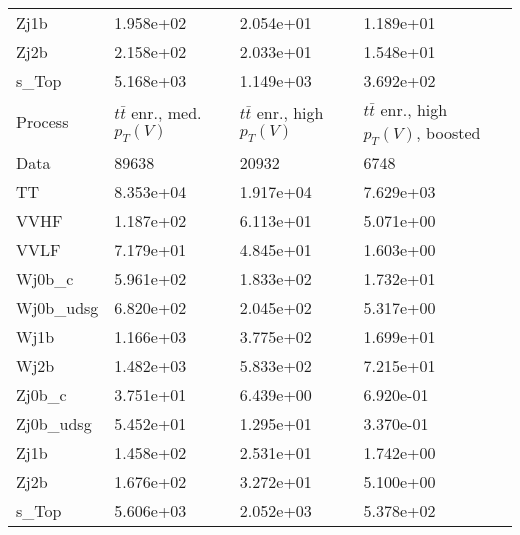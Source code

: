 \begin{table}
{\begin{tabularx}{0.8\textwidth}{|X|X|X|X|}
Zj1b & 1.958e+02 & 2.054e+01 & 1.189e+01 \\
Zj2b & 2.158e+02 & 2.033e+01 & 1.548e+01 \\
s\_Top & 5.168e+03 & 1.149e+03 & 3.692e+02 \\
\hline
\hline
Process & $t\bar{t}$ enr., med. $p_{T}(V)$ & $t\bar{t}$ enr., high $p_{T}(V)$ & $t\bar{t}$ enr., high $p_{T}(V)$, boosted \\
\hline
Data & 89638 & 20932 & 6748 \\
\hline
TT & 8.353e+04 & 1.917e+04 & 7.629e+03 \\
VVHF & 1.187e+02 & 6.113e+01 & 5.071e+00 \\
VVLF & 7.179e+01 & 4.845e+01 & 1.603e+00 \\
Wj0b\_c & 5.961e+02 & 1.833e+02 & 1.732e+01 \\
Wj0b\_udsg & 6.820e+02 & 2.045e+02 & 5.317e+00 \\
Wj1b & 1.166e+03 & 3.775e+02 & 1.699e+01 \\
Wj2b & 1.482e+03 & 5.833e+02 & 7.215e+01 \\
Zj0b\_c & 3.751e+01 & 6.439e+00 & 6.920e-01 \\
Zj0b\_udsg & 5.452e+01 & 1.295e+01 & 3.370e-01 \\
Zj1b & 1.458e+02 & 2.531e+01 & 1.742e+00 \\
Zj2b & 1.676e+02 & 3.272e+01 & 5.100e+00 \\
s\_Top & 5.606e+03 & 2.052e+03 & 5.378e+02 \\
\hline
\end{tabularx}
}
\label{tab:cr-Wmn-2018}
\end{table}

